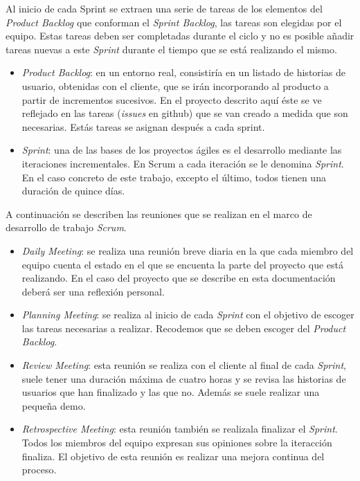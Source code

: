 Al inicio de cada Sprint se extraen una serie de tareas de los elementos del \textit{Product Backlog} que conforman el \textit{Sprint Backlog}, las tareas son elegidas por el equipo. Estas tareas deben ser completadas durante el ciclo y no es posible añadir tareas nuevas a este \textit{Sprint} durante el tiempo que se está realizando el mismo.

\begin{itemize}	
	\item \textit{Product Backlog}: en un entorno real, consistiría en un listado de historias de usuario, obtenidas con el cliente, que se irán incorporando al producto a partir de incrementos sucesivos. En el proyecto descrito aquí éste se ve reflejado en las tareas (\textit{issues} en github) que se van creado a medida que son necesarias. Estás tareas se asignan después a cada sprint.
	\item \textit{Sprint}: una de las bases de los proyectos ágiles es el desarrollo mediante las iteraciones incrementales. En Scrum a cada iteración se le denomina \textit{Sprint}. En el caso concreto de este trabajo, excepto el último, todos tienen una duración de quince días.
\end{itemize}


A continuación se describen las reuniones que se realizan en el marco de desarrollo de trabajo \textit{Scrum}. 
\begin{itemize}	
	\item \textit{Daily Meeting}: se realiza una reunión breve diaria en la que cada miembro del equipo cuenta el estado en el que se encuenta la parte del proyecto que está realizando. En el caso del proyecto que se describe en esta documentación deberá ser una reflexión personal.
	\item \textit{Planning Meeting}: se realiza al inicio de cada \textit{Sprint} con el objetivo de escoger las tareas necesarias a realizar. Recodemos que se deben escoger del \textit{Product Backlog}.
	\item \textit{Review Meeting}:  esta reunión se realiza con el cliente al final de cada \textit{Sprint}, suele tener una duración máxima de cuatro horas y se revisa las historias de usuarios que han finalizado y las que no. Además se suele realizar una pequeña demo.
	\item \textit{Retrospective Meeting}: esta reunión también se realizala finalizar el \textit{Sprint}. Todos los miembros del equipo expresan sus opiniones sobre la iteracción finaliza. El objetivo de esta reunión es realizar una mejora continua del proceso. 
\end{itemize}


